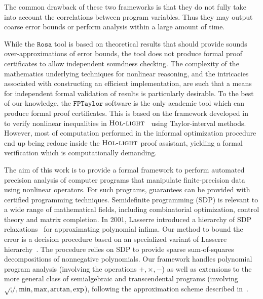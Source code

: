 \documentclass[preprint,fleqn,nocopyrightspace]{sigplanconf}
\newcommand{\hol}{\text{\sc Hol-light}}
\newcommand{\rosa}{\mathtt{Rosa}}
\newcommand{\fptaylor}{\mathtt{FPTaylor}}
\theoremstyle{plain}
\begin{document}
The common drawback of these two frameworks is that they do not fully take into account the correlations between program variables. Thus they may output coarse error bounds or perform analysis within a large amount of time.  

While the $\rosa$ tool is based on theoretical results that should provide sounds over-approximations of error bounds, the tool does not produce formal proof certificates to allow independent soundness checking.  The complexity of the mathematics underlying techniques for nonlinear reasoning, and the intricacies associated with constructing an efficient implementation, are such that a means for independent formal validation of results is particularly desirable.  
To the best of our knowledge, the $\fptaylor$ software is the only academic tool which can produce formal proof certificates. This is based on the framework developed in~\cite{SolovyevH13} to verify nonlinear inequalities in $\hol$~\cite{hollight} using Taylor-interval methods. However, most of computation performed in the informal optimization procedure end up being redone inside the $\hol$ proof assistant, yielding a formal verification which is computationally demanding.

The aim of this work is to provide a formal framework to perform automated precision analysis of computer programs that manipulate finite-precision data using nonlinear operators. For such programs, guarantees can be provided with certified programming techniques.
Semidefinite programming (SDP) is relevant to a wide range of mathematical fields, including combinatorial optimization, control theory and matrix completion. In 2001, Lasserre introduced a hierarchy of SDP relaxations~\cite{Lasserre01moments} for approximating polynomial infima. Our method to bound the error is a decision procedure based on an specialized variant of Lasserre hierarchy~\cite{Las06SparseSOS}. The procedure relies on SDP to provide sparse sum-of-squares decompositions of nonnegative polynomials. Our framework handles polynomial program analysis (involving the operations $+,\times,-$) as well as extensions to the more general class of semialgebraic and transcendental programs (involving $\sqrtsign, /, \min, \max, \arctan, \exp$), following the approximation scheme described in~\cite{Magron15sdp}.
%
\end{document}
